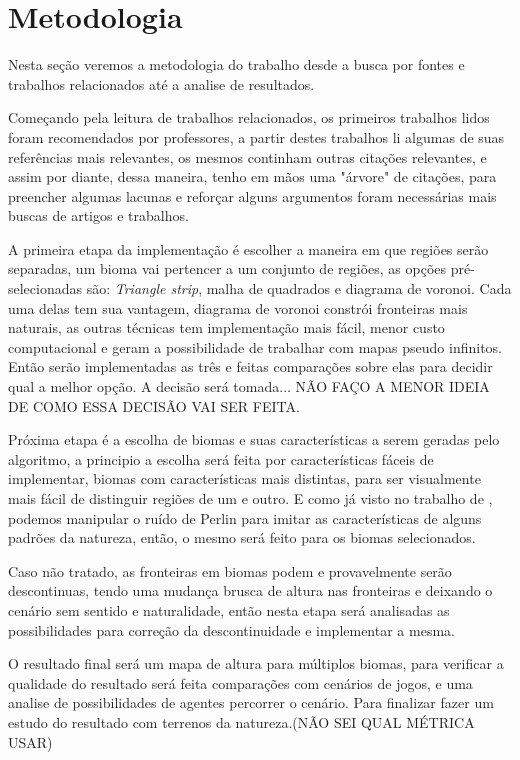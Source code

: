 \chapter{Metodologia}
Nesta seção veremos a metodologia do trabalho desde a busca por fontes e trabalhos
relacionados até a analise de resultados.

Começando pela leitura de trabalhos relacionados, os primeiros trabalhos lidos
foram recomendados por professores, a partir destes trabalhos li algumas de suas
referências mais relevantes, os mesmos continham outras citações relevantes, e
assim por diante, dessa maneira, tenho em mãos uma "árvore" de citações,
para preencher algumas lacunas e reforçar alguns argumentos foram necessárias
mais buscas de artigos e trabalhos.

A primeira etapa da implementação é escolher a maneira em que regiões serão
separadas, um bioma vai pertencer a um conjunto de regiões, as opções
pré-selecionadas são: \textit{Triangle strip}, malha de quadrados e diagrama de
voronoi. Cada uma delas tem sua vantagem, diagrama de voronoi constrói fronteiras
mais naturais, as outras técnicas tem implementação mais fácil, menor custo
computacional e geram a possibilidade de trabalhar com mapas pseudo infinitos.
Então serão implementadas as três e feitas comparações sobre elas para decidir
qual a melhor opção. A decisão será tomada...
NÃO FAÇO A MENOR IDEIA DE COMO ESSA DECISÃO VAI SER FEITA.

Próxima etapa é a escolha de biomas e suas características a serem geradas pelo %
algoritmo, a principio a escolha será feita por características fáceis de
implementar, biomas com características mais distintas, para ser visualmente
mais fácil de distinguir regiões de um e outro. %
E como já visto no trabalho de \cite{carli2012canion}, podemos manipular o ruído
de Perlin para imitar as características de alguns padrões da natureza, então, 
o mesmo será feito para os biomas selecionados.

Caso não tratado, as fronteiras em biomas podem e provavelmente serão
descontinuas, tendo uma mudança brusca de altura nas fronteiras e deixando o
cenário sem sentido e naturalidade, então nesta etapa será analisadas as
possibilidades para correção da descontinuidade e implementar a mesma.

O resultado final será um mapa de altura para múltiplos biomas, para verificar
a qualidade do resultado será feita comparações com cenários de jogos, e uma
analise de possibilidades de agentes percorrer o cenário. Para finalizar fazer
um estudo do resultado com terrenos da natureza.(NÃO SEI QUAL MÉTRICA USAR)
